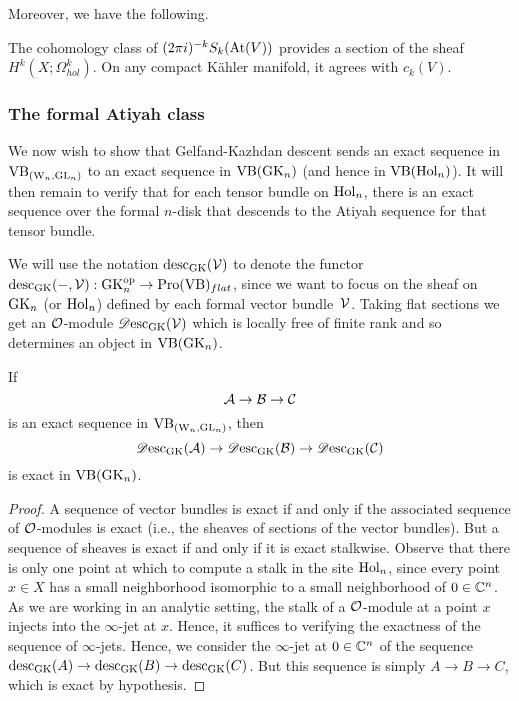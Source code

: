 Moreover, we have the following.

\begin{lemma}
The cohomology class of $(2\pi i)^{-k} S_k({\rm At}(V))$ provides a section
of the sheaf $H^k(X ; \Omega^k_{hol})$. On any compact K\"ahler manifold, it agrees with $c_k(V)$.
\end{lemma}

\subsubsection{The formal Atiyah class}

We now wish to show that Gelfand-Kazhdan descent sends an exact sequence in ${\rm VB}_{({{\rm W}_n}, {\rm GL}_n)}$ to an exact sequence in ${\rm VB}({\rm GK}_n)$ (and hence in ${\rm VB}({\rm Hol}_n)$). 
It will then remain to verify that for each tensor bundle on ${\rm Hol}_n$, 
there is an exact sequence over the formal $n$-disk that descends to the Atiyah sequence for that tensor bundle.

We will use the notation ${\rm desc}_{\rm GK}(\mathcal{V})$ to denote the functor ${\rm desc}_{\rm GK}(-,\mathcal{V}): {\rm GK}_n^{{\rm op}} \to {\rm Pro}({\rm VB})_{flat}$, 
since we want to focus on the sheaf on ${\rm GK}_n$ (or ${\rm Hol}_n$) defined
by each formal vector bundle~$\mathcal{V}$. Taking flat sections we get an
$\mathcal O$-module $\mathscr{D}{\rm esc}_{{\rm GK}}(\mathcal{V})$ which is locally free of finite
rank and so determines an object in ${\rm VB}({\rm GK}_n)$. 

\begin{lemma}
If $$\mathcal{A} \to \mathcal B \to \mathcal C$$ is an exact sequence in ${\rm VB}_{({{\rm W}_n}, {\rm GL}_n)}$, then 
$$\mathscr{D}{\rm esc}_{\rm GK}(\mathcal{A}) \to \mathscr{D}{\rm esc}_{\rm GK}(\mathcal B) \to \mathscr{D}{\rm esc}_{\rm GK}(\mathcal C)$$ 
is exact in ${\rm VB}({\rm GK}_n)$.
\end{lemma}

\begin{proof}
A sequence of vector bundles is exact if and only if the associated
sequence of $\mathcal O$-modules is exact (i.e., the sheaves of sections of
the vector bundles). But a sequence of sheaves is exact if and only if
it is exact stalkwise. Observe that there is only one point at which
to compute a stalk in the site ${\rm Hol}_n$, since every point $x \in X$
has a small neighborhood isomorphic to a small neighborhood of $0 \in
\mathbb C^n$. As we are working in an analytic setting, the stalk of a
$\mathcal O$-module at a point $x$ injects into the $\infty$-jet at
$x$. Hence, it suffices to verifying the exactness of the sequence of
$\infty$-jets. Hence, we consider the $\infty$-jet at $0 \in \mathbb C^n$ of
the sequence ${\rm desc}_{\rm GK}(A) \to {\rm desc}_{\rm GK}(B) \to {\rm desc}_{\rm GK}(C)$. But
this sequence is simply $A \to B \to C$, which is exact by
hypothesis.
\end{proof}


